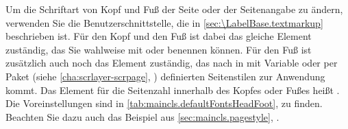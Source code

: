 \BeginIndexGroup
{}%
%
%
%
Um die Schriftart von Kopf und Fuß der Seite oder der Seitenangabe zu ändern,
verwenden Sie die Benutzerschnittstelle, die in
\autoref{sec:\LabelBase.textmarkup} beschrieben ist. Für den Kopf und den Fuß
ist dabei das gleiche Element zuständig, das Sie wahlweise mit
 oder
 benennen können. Für den
Fuß ist zusätzlich auch noch das Element
 zuständig, das nach
 in mit Variable
 oder per Paket
\hyperref[cha:scrlayer-scrpage]{}%
%
 (siehe
\autoref{cha:scrlayer-scrpage},
) definierten Seitenstilen
zur Anwendung kommt. Das Element für die Seitenzahl innerhalb des Kopfes oder
Fußes heißt . Die
Voreinstellungen sind in \autoref{tab:maincls.defaultFontsHeadFoot},
 zu finden. Beachten Sie dazu
auch das Beispiel aus \autoref{sec:maincls.pagestyle},
.%
%
\EndIndexGroup
%
\EndIndexGroup


